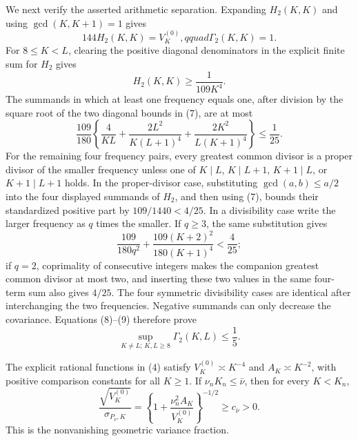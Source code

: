 We next verify the asserted arithmetic separation.  Expanding \(H_2(K,K)\) and using \(\gcd(K,K+1)=1\) gives
\[
 144H_2(K,K)=V_K^{(0)},qquad \Gamma_2(K,K)=1.                           \tag{6}
\]
For \(8\leq K<L\), clearing the positive diagonal denominators in the explicit finite sum for \(H_2\) gives
\[
 H_2(K,K)\geq\frac1{109K^4}.                                             \tag{7}
\]
The summands in which at least one frequency equals one, after division by the square root of the two diagonal bounds in (7), are at most
\[
 \frac{109}{180}\left\{\frac4{KL}
 +\frac{2L^2}{K(L+1)^4}+\frac{2K^2}{L(K+1)^4}\right\}\leq\frac1{25}.    \tag{8}
\]
For the remaining four frequency pairs, every greatest common divisor is a proper divisor of the smaller frequency unless one of \(K\mid L\), \(K\mid L+1\), \(K+1\mid L\), or \(K+1\mid L+1\) holds.  In the proper-divisor case, substituting \(\gcd(a,b)\leq a/2\) into the four displayed summands of \(H_2\), and then using (7), bounds their standardized positive part by \(109/1440<4/25\).  In a divisibility case write the larger frequency as \(q\) times the smaller.  If \(q\geq3\), the same substitution gives
\[
 \frac{109}{180q^2}+\frac{109(K+2)^2}{180(K+1)^4}<\frac4{25};             \tag{9}
\]
if \(q=2\), coprimality of consecutive integers makes the companion greatest common divisor at most two, and inserting these two values in the same four-term sum also gives \(4/25\).  The four symmetric divisibility cases are identical after interchanging the two frequencies.  Negative summands can only decrease the covariance.  Equations (8)--(9) therefore prove
\[
 \sup_{K\ne L;\,K,L\geq8}\Gamma_2(K,L)\leq\frac15.                    \tag{10}
\]

The explicit rational functions in (4) satisfy \(V_K^{(0)}\asymp K^{-4}\) and \(A_K\asymp K^{-2}\), with positive comparison constants for all \(K\geq1\).  If \(\nu_nK_n\leq\bar\nu\), then for every \(K<K_n\),
\[
 \frac{\sqrt{V_K^{(0)}}}{\sigma_{P_\nu,K}}
 =\left\{1+\frac{\nu_n^2A_K}{V_K^{(0)}}\right\}^{-1/2}
 \geq c_{\bar\nu}>0.                                                     \tag{11}
\]
This is the nonvanishing geometric variance fraction.


